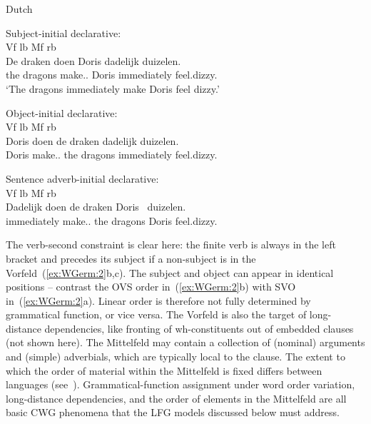 \documentclass[output=paper,hidelinks]{langscibook}
\begin{document}
%
\begin{exe}
  \ex\label{ex:WGerm:2} Dutch 
  \begin{xlist}
  \ex Subject-initial declarative:\\
      {\glll
        Vf\streep{3.25em} {}     lb\streep{1em}   Mf\streep{4.25em}    {}  rb\streep{2.5em}\\
        De draken doen Doris dadelijk duizelen.\\
           the dragons make.\PRS.\PL{} Doris immediately feel.dizzy.\INF{}\\}
           \glt `The dragons immediately make Doris feel dizzy.'
        
   \ex Object-initial declarative:\\    
      {\glll%
        Vf\streep{1em}      lb\streep{1em}   Mf\streep{6.75em} {} {}  rb\streep{2.5em}\\
        Doris doen de draken dadelijk duizelen.\\
        Doris make.\PRS.\PL{} the dragons immediately feel.dizzy.\INF{}\\}
   
   \ex Sentence adverb-initial declarative:\\   
      {\glll%
        Vf\streep{2.15em}      lb\streep{1em}   Mf\streep{6em} {} {}  rb\streep{2.5em}\\
        Dadelijk doen de draken Doris~ duizelen.\\
        immediately make.\PRS.\PL{} the dragons Doris feel.dizzy.\INF{}\\}
  \end{xlist}
\end{exe}
%
The verb-second constraint is clear here: the finite verb is always in
the left bracket and precedes its subject if a non-subject is in the
Vorfeld~(\ref{ex:WGerm:2}b,c). The subject and object can appear in identical
positions -- contrast the OVS order in~(\ref{ex:WGerm:2}b) with SVO
in~(\ref{ex:WGerm:2}a). Linear order is therefore not fully determined by
grammatical function, or vice versa. The Vorfeld is also the target of
long-distance dependencies, like fronting of wh-constituents out of
embedded clauses (not shown here). The Mittelfeld may contain a
collection of (nominal) arguments and (simple) adverbials, which are
typically local to the clause. The extent to which the order of material
within the Mittelfeld is fixed differs between languages
(see~). Grammatical-function assignment under
word order variation, long-distance dependencies, and the order of
elements in the Mittelfeld are all basic CWG phenomena that the LFG
models discussed below must address.
\end{document}
